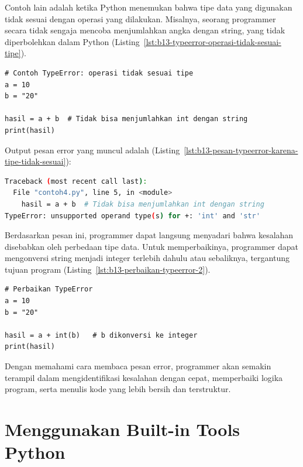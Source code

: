 Contoh lain adalah ketika Python menemukan bahwa tipe data yang digunakan tidak sesuai dengan operasi yang dilakukan. Misalnya, seorang programmer secara tidak sengaja mencoba menjumlahkan angka dengan string, yang tidak diperbolehkan dalam Python (Listing~\ref{lst:b13-typeerror-operasi-tidak-sesuai-tipe}).

\begin{lstlisting}[style=PythonStyle, caption={Contoh TypeError: operasi tidak sesuai tipe}, label={lst:b13-typeerror-operasi-tidak-sesuai-tipe}]
# Contoh TypeError: operasi tidak sesuai tipe
a = 10
b = "20"

hasil = a + b  # Tidak bisa menjumlahkan int dengan string
print(hasil)
\end{lstlisting}

Output pesan error yang muncul adalah (Listing~\ref{lst:b13-pesan-typeerror-karena-tipe-tidak-sesuai}):

\begin{lstlisting}[language=bash, caption={Pesan TypeError karena tipe tidak sesuai}, label={lst:b13-pesan-typeerror-karena-tipe-tidak-sesuai}]
Traceback (most recent call last):
  File "contoh4.py", line 5, in <module>
    hasil = a + b  # Tidak bisa menjumlahkan int dengan string
TypeError: unsupported operand type(s) for +: 'int' and 'str'
\end{lstlisting}

Berdasarkan pesan ini, programmer dapat langsung menyadari bahwa kesalahan disebabkan oleh perbedaan tipe data. Untuk memperbaikinya, programmer dapat mengonversi string menjadi integer terlebih dahulu atau sebaliknya, tergantung tujuan program (Listing~\ref{lst:b13-perbaikan-typeerror-2}).

\begin{lstlisting}[style=PythonStyle, caption={Perbaikan TypeError}, label={lst:b13-perbaikan-typeerror-2}]
# Perbaikan TypeError
a = 10
b = "20"

hasil = a + int(b)   # b dikonversi ke integer
print(hasil)
\end{lstlisting}

Dengan memahami cara membaca pesan error, programmer akan semakin terampil dalam mengidentifikasi kesalahan dengan cepat, memperbaiki logika program, serta menulis kode yang lebih bersih dan terstruktur.


\section{Menggunakan Built-in Tools Python}

